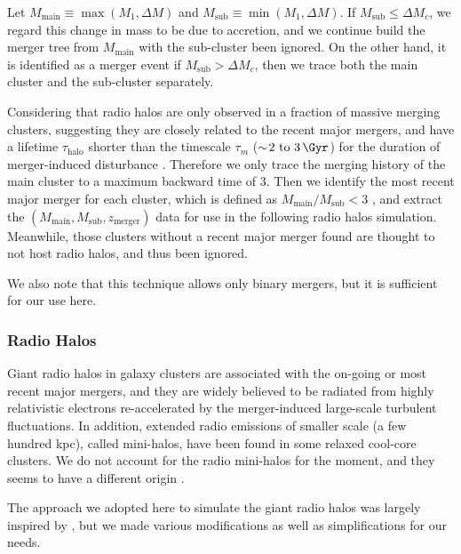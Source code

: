 \documentclass[modern]{aastex61}
\newcommand{\R}[1]{\mathrm{#1}}
\begin{document}
Let $M_{\R{main}} \equiv \max(M_1, \Delta M)$ and
$M_{\R{sub}} \equiv \min(M_1, \Delta M)$.
If $M_{\R{sub}} \leq \Delta M_c$, we regard this change in mass
to be due to accretion, and we continue build the merger tree from
$M_{\R{main}}$ with the sub-cluster been ignored.
On the other hand, it is identified as a merger event if
$M_{\R{sub}} > \Delta M_c$, then we trace both the main cluster
and the sub-cluster separately.

Considering that radio halos are only observed in
a fraction of massive merging clusters, suggesting they are closely
related to the recent major mergers, and have a lifetime
$\tau_{\R{halo}}$ shorter than the timescale
$\tau_m$ ($\sim\! \SIrange[range-units=single]{2}{3}{\Gyr}$)
for the duration of merger-induced disturbance \citep{cassano2016}.
Therefore we only trace the merging history of the main cluster
to a maximum backward time of \SI{3}{\Gyr}.
Then we identify the most recent major merger for each cluster,
which is defined as $M_{\R{main}}/M_{\R{sub}} < 3$
\citep[e.g.,][]{wetzel2009},
and extract the $(M_{\R{main}}, M_{\R{sub}}, z_{\R{merger}})$
data for use in the following radio halos simulation.
Meanwhile, those clusters without a recent major merger found
are thought to not host radio halos, and thus been ignored.

We also note that this technique allows only binary mergers,
but it is sufficient for our use here.


\subsubsection{Radio Halos}
\label{sec:halo}

Giant radio halos in galaxy clusters are associated with the on-going or
most recent major mergers, and they are widely believed to be radiated from
highly relativistic electrons re-accelerated by the merger-induced
large-scale turbulent fluctuations.
In addition, extended radio emissions of smaller scale (a few hundred kpc),
called mini-halos, have been found in some relaxed cool-core clusters.
We do not account for the radio mini-halos for the moment, and they
seems to have a different origin \citep{feretti2012rev}.

The approach we adopted here to simulate the giant radio halos
was largely inspired by \citet{cassano2005}, but we
made various modifications as well as simplifications for our needs.
\end{document}
